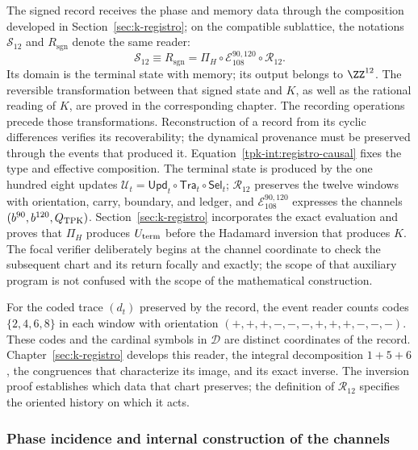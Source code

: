 The signed record receives the phase and memory data through the
composition developed in Section~\ref{sec:k-registro}; on the
compatible sublattice, the notations \(\mathcal S_{12}\) and
\(R_{\mathrm{sgn}}\) denote the same reader:
\begin{equation}
 \mathcal S_{12}\equiv R_{\mathrm{sgn}}
 =\Pi_H\circ\mathcal E_{108}^{90,120}
                         \circ\mathcal R_{12}.
 \label{tpk-int:registro-causal}
\end{equation}
Its domain is the terminal state with memory; its output belongs to
\(\ZZ^{12}\). The reversible transformation between that signed state
and \(K\), as well as the rational reading of \(K\), are proved in
the corresponding chapter. The recording operations precede
those transformations. Reconstruction of a record from its cyclic
differences verifies its recoverability; the dynamical provenance
must be preserved through the events that produced it.
Equation~\eqref{tpk-int:registro-causal} fixes the type and effective
composition. The terminal state is produced by the one hundred eight updates
\(\mathcal U_t=\mathsf{Upd}_t\circ\mathsf{Tra}_t\circ\mathsf{Sel}_t\);
\(\mathcal R_{12}\) preserves the twelve windows with orientation, carry,
boundary, and ledger, and \(\mathcal E_{108}^{90,120}\) expresses the channels
\((b^{90},b^{120},Q_{\rm TPK})\). Section~\ref{sec:k-registro}
incorporates the exact evaluation and proves that
\(\Pi_H\) produces \(U_{\rm term}\) before the Hadamard inversion that
produces \(K\). The focal verifier deliberately begins at the channel
coordinate to check the subsequent chart and its return focally and exactly;
the scope of that auxiliary program is not confused with the scope of
the mathematical construction.

For the coded trace \((d_t)\) preserved by the record, the
event reader counts codes \(\{2,4,6,8\}\) in each
window with orientation
\((+,+,+,-,-,-,+,+,+,-,-,-)\). These codes and the cardinal
symbols in \(\mathcal D\) are distinct coordinates of the
record. Chapter~\ref{sec:k-registro} develops this reader,
the integral decomposition \(1+5+6\), the congruences that
characterize its image, and its exact inverse. The inversion proof
establishes which data that chart preserves; the definition of
\(\mathcal R_{12}\) specifies the oriented history on which it
acts.

\subsubsection{Phase incidence and internal construction of the channels}
\label{tpk-int:incidencia}


